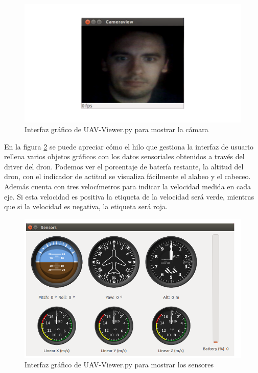\begin{figure}[H]
  \centering
  \includegraphics[scale=0.4]{imagenes/cameraView.png}
  \caption{Interfaz gráfico de UAV-Viewer.py para mostrar la cámara}
  \label{fig:cameraView}
\end{figure}

En la figura \ref{fig:sensores} se puede apreciar cómo el hilo que gestiona la interfaz de usuario rellena varios objetos gráficos con los datos sensoriales obtenidos a través del driver del dron. Podemos ver el porcentaje de batería restante, la altitud del dron, con el indicador de actitud se visualiza fácilmente el alabeo y el cabeceo. Además cuenta con tres velocímetros para indicar la velocidad medida en cada eje. Si esta velocidad es positiva la etiqueta de la velocidad será verde, mientras que si la velocidad es negativa, la etiqueta será roja.

\begin{figure}[H]
  \centering
  \includegraphics[scale=0.4]{imagenes/sensores.png}
  \caption{Interfaz gráfico de UAV-Viewer.py para mostrar los sensores}
  \label{fig:sensores}
\end{figure}


